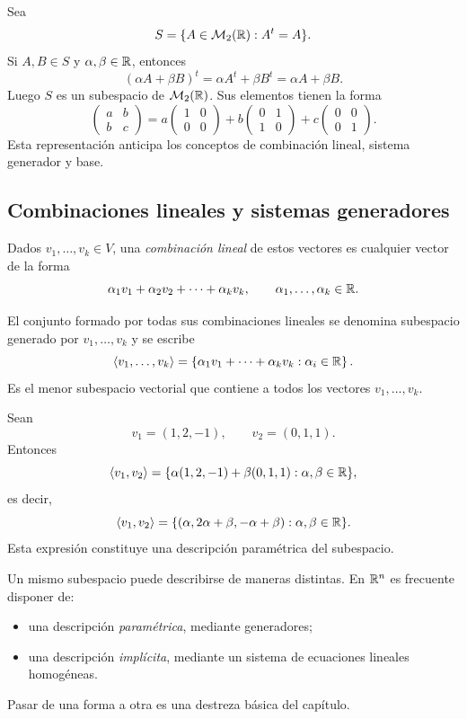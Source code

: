 \begin{example}
Sea
\[
S=\{A\in\mathcal M_2(\mathbb{R}):A^t=A\}.
\]
Si $A,B\in S$ y $\alpha,\beta\in\mathbb{R}$, entonces
\[
(\alpha A+\beta B)^t
=\alpha A^t+\beta B^t
=\alpha A+\beta B.
\]
Luego $S$ es un subespacio de $\mathcal M_2(\mathbb{R})$. Sus elementos tienen la forma
\[
\begin{pmatrix}
a&b\\
b&c
\end{pmatrix}
=
a\begin{pmatrix}1&0\\0&0\end{pmatrix}
+b\begin{pmatrix}0&1\\1&0\end{pmatrix}
+c\begin{pmatrix}0&0\\0&1\end{pmatrix}.
\]
Esta representación anticipa los conceptos de combinación lineal, sistema generador y base.
\end{example}

\subsection{Combinaciones lineales y sistemas generadores}

\begin{definition}
Dados $v_1,\ldots,v_k\in V$, una \emph{combinación lineal} de estos vectores es cualquier vector de la forma
\[
\alpha_1v_1+\alpha_2v_2+\cdots+\alpha_kv_k,
\qquad
\alpha_1,\ldots,\alpha_k\in\mathbb{R}.
\]
\end{definition}

El conjunto formado por todas sus combinaciones lineales se denomina subespacio generado por $v_1,\ldots,v_k$ y se escribe
\[
\langle v_1,\ldots,v_k\rangle
=
\left\{
\alpha_1v_1+\cdots+\alpha_kv_k:
\alpha_i\in\mathbb{R}
\right\}.
\]
Es el menor subespacio vectorial que contiene a todos los vectores $v_1,\ldots,v_k$.

\begin{example}
Sean
\[
v_1=(1,2,-1),
\qquad
v_2=(0,1,1).
\]
Entonces
\[
\langle v_1,v_2\rangle
=
\{\alpha(1,2,-1)+\beta(0,1,1):\alpha,\beta\in\mathbb{R}\},
\]
es decir,
\[
\langle v_1,v_2\rangle
=
\{(\alpha,2\alpha+\beta,-\alpha+\beta):\alpha,\beta\in\mathbb{R}\}.
\]
Esta expresión constituye una descripción paramétrica del subespacio.
\end{example}

Un mismo subespacio puede describirse de maneras distintas. En $\mathbb{R}^n$ es frecuente disponer de:
\begin{itemize}
\item una descripción \emph{paramétrica}, mediante generadores;
\item una descripción \emph{implícita}, mediante un sistema de ecuaciones lineales homogéneas.
\end{itemize}
Pasar de una forma a otra es una destreza básica del capítulo.

